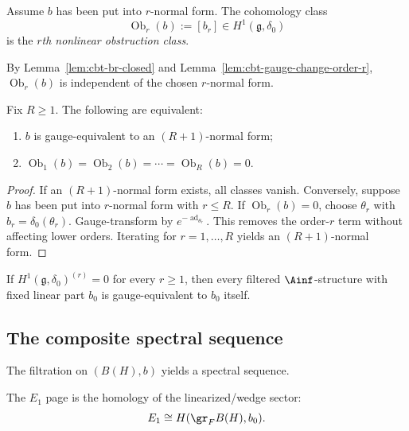 \begin{definition}
Assume $b$ has been put into $r$-normal form. The cohomology class
\[
\operatorname{Ob}_r(b):=[b_r]\in H^1(\mathfrak g,\delta_0)
\]
is the \emph{$r$th nonlinear obstruction class}.
\end{definition}

By Lemma~\ref{lem:cbt-br-closed} and Lemma~\ref{lem:cbt-gauge-change-order-r}, $\operatorname{Ob}_r(b)$ is independent of the chosen $r$-normal form.

\begin{theorem}
Fix $R\ge1$. The following are equivalent:
\begin{enumerate}[label=\textup{(\roman*)},leftmargin=2em]
\item $b$ is gauge-equivalent to an $(R+1)$-normal form;
\item $\operatorname{Ob}_1(b)=\operatorname{Ob}_2(b)=\cdots=\operatorname{Ob}_R(b)=0$.
\end{enumerate}
\end{theorem}

\begin{proof}
If an $(R+1)$-normal form exists, all classes vanish. Conversely, suppose $b$ has been put into $r$-normal form with $r\le R$. If $\operatorname{Ob}_r(b)=0$, choose $\theta_r$ with $b_r=\delta_0(\theta_r)$. Gauge-transform by $e^{-\operatorname{ad}_{\theta_r}}$. This removes the order-$r$ term without affecting lower orders. Iterating for $r=1,\dots,R$ yields an $(R+1)$-normal form.
\end{proof}

\begin{corollary}
If $H^1(\mathfrak g,\delta_0)^{(r)}=0$ for every $r\ge1$, then every filtered $\Ainf$-structure with fixed linear part $b_0$ is gauge-equivalent to $b_0$ itself.
\end{corollary}

\subsection{The composite spectral sequence}

The filtration on $(B(H),b)$ yields a spectral sequence.

\begin{proposition}
The $E_1$ page is the homology of the linearized/wedge sector:
\[
E_1\cong H(\gr_FB(H),b_0).
\]
\end{proposition}

